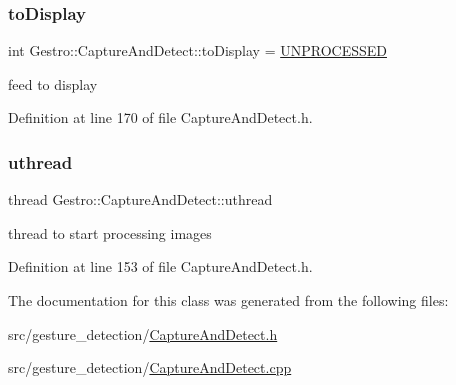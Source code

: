 \subsubsection{\texorpdfstring{to\+Display}{toDisplay}}
{\footnotesize\ttfamily int Gestro\+::\+Capture\+And\+Detect\+::to\+Display = \hyperlink{_capture_and_detect_8h_a425a93be55e757f5e351ec9d6770c50ea93c33b647b7a4b7299c25e4e6d98ef7e}{U\+N\+P\+R\+O\+C\+E\+S\+S\+ED}\hspace{0.3cm}{\ttfamily [private]}}



feed to display 



Definition at line 170 of file Capture\+And\+Detect.\+h.

\mbox{\label{class_gestro_1_1_capture_and_detect_a0c143ab4c3181d7f32da71bb161e8d02}} 
\subsubsection{\texorpdfstring{uthread}{uthread}}
{\footnotesize\ttfamily thread Gestro\+::\+Capture\+And\+Detect\+::uthread\hspace{0.3cm}{\ttfamily [private]}}



thread to start processing images 



Definition at line 153 of file Capture\+And\+Detect.\+h.



The documentation for this class was generated from the following files\+:\begin{DoxyCompactItemize}
\item 
src/gesture\+\_\+detection/\hyperlink{_capture_and_detect_8h}{Capture\+And\+Detect.\+h}\item 
src/gesture\+\_\+detection/\hyperlink{_capture_and_detect_8cpp}{Capture\+And\+Detect.\+cpp}\end{DoxyCompactItemize}
